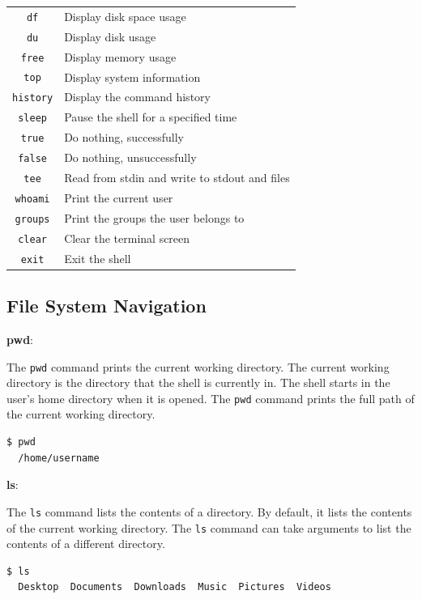 \begin{table}[h!]
\begin{tabular}{ c l }
  \texttt{df} & Display disk space usage \\
  \texttt{du} & Display disk usage \\
  \texttt{free} & Display memory usage \\
  \texttt{top} & Display system information \\
  \texttt{history} & Display the command history \\
  \texttt{sleep} & Pause the shell for a specified time \\
  \texttt{true} & Do nothing, successfully \\
  \texttt{false} & Do nothing, unsuccessfully \\
  \texttt{tee} & Read from stdin and write to stdout and files \\
  \texttt{whoami} & Print the current user \\
  \texttt{groups} & Print the groups the user belongs to \\
  \texttt{clear} & Clear the terminal screen \\
  \texttt{exit} & Exit the shell \\
  \bottomrule
\end{tabular}
\end{table}

\subsection{File System Navigation}

\textbf{pwd}:

The \texttt{pwd} command prints the current working directory. The current working directory is the directory that the shell is currently in. The shell starts in the user's home directory when it is opened. The \texttt{pwd} command prints the full path of the current working directory.

\begin{lstlisting}[language=bash]
  $ pwd
  /home/username
\end{lstlisting}

\textbf{ls}:

The \texttt{ls} command lists the contents of a directory. By default, it lists the contents of the current working directory. The \texttt{ls} command can take arguments to list the contents of a different directory.

\begin{lstlisting}[language=bash]
  $ ls
  Desktop  Documents  Downloads  Music  Pictures  Videos
\end{lstlisting}

